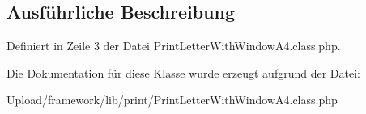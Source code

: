 \subsection{Ausführliche Beschreibung}


Definiert in Zeile 3 der Datei Print\+Letter\+With\+Window\+A4.\+class.\+php.



Die Dokumentation für diese Klasse wurde erzeugt aufgrund der Datei\+:\begin{DoxyCompactItemize}
\item 
Upload/framework/lib/print/Print\+Letter\+With\+Window\+A4.\+class.\+php\end{DoxyCompactItemize}
